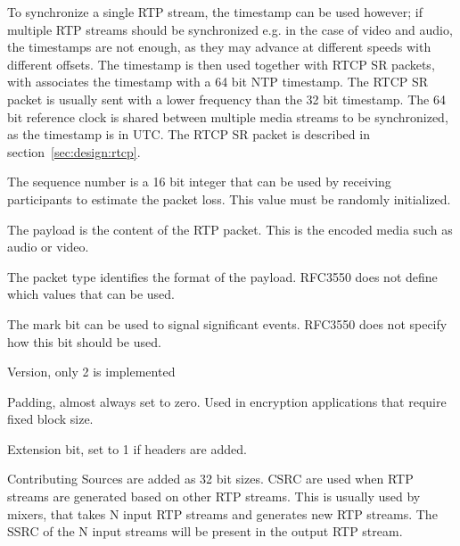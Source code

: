 To synchronize a single RTP stream, the timestamp can be used however; if multiple RTP streams should be synchronized e.g. in the case of video and audio, the timestamps are not enough, as they may advance at different speeds with different offsets. The timestamp is then used together with RTCP SR packets, with associates the timestamp with a 64 bit NTP timestamp. The RTCP SR packet is usually sent with a lower frequency than the 32 bit timestamp. The 64 bit reference clock is shared between multiple media streams to be synchronized, as the timestamp is in \ac{UTC}. The RTCP SR packet is described in section~\ref{sec:design:rtcp}.


The sequence number is a 16 bit integer that can be used by receiving participants to estimate the packet loss. This value must be randomly initialized.

The payload is the content of the RTP packet. This is the encoded media such as audio or video. 

The packet type identifies the format of the payload. RFC3550 does not define which values that can be used.


The mark bit can be used to signal significant events. RFC3550 does not specify how this bit should be used.

Version, only 2 is implemented

Padding, almost always set to zero. Used in encryption applications that require fixed block size.

Extension bit, set to 1 if headers are added.

Contributing Sources are added as 32 bit sizes. CSRC are used when RTP streams are generated based on other RTP streams. This is usually used by mixers, that takes N input RTP streams and generates new RTP streams. The SSRC of the N input streams will be present in the output RTP stream.

